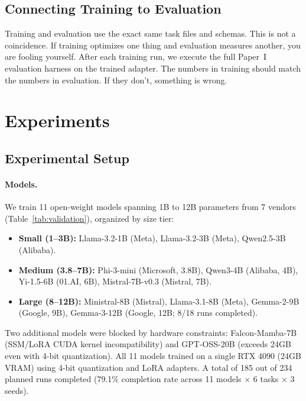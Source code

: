 \documentclass[11pt]{article}
\begin{document}
\subsection{Connecting Training to Evaluation}

Training and evaluation use the exact same task files and schemas.
This is not a coincidence.
If training optimizes one thing and evaluation measures another, you are fooling yourself.
After each training run, we execute the full Paper~I evaluation harness on the trained adapter.
The numbers in training should match the numbers in evaluation.
If they don't, something is wrong.

\section{Experiments}
\label{sec:experiments}

\subsection{Experimental Setup}

\paragraph{Models.}
We train 11 open-weight models spanning 1B to 12B parameters from 7 vendors (Table~\ref{tab:validation}), organized by size tier:
\begin{itemize}[leftmargin=12pt]
    \item \textbf{Small (1--3B):} Llama-3.2-1B (Meta), Llama-3.2-3B (Meta), Qwen2.5-3B (Alibaba).
    \item \textbf{Medium (3.8--7B):} Phi-3-mini (Microsoft, 3.8B), Qwen3-4B (Alibaba, 4B), Yi-1.5-6B (01.AI, 6B), Mistral-7B-v0.3 (Mistral, 7B).
    \item \textbf{Large (8--12B):} Ministral-8B (Mistral), Llama-3.1-8B (Meta), Gemma-2-9B (Google, 9B), Gemma-3-12B (Google, 12B; 8/18 runs completed).
\end{itemize}
Two additional models were blocked by hardware constraints: Falcon-Mamba-7B (SSM/LoRA CUDA kernel incompatibility) and GPT-OSS-20B (exceeds 24GB even with 4-bit quantization).  All 11 models trained on a single RTX 4090 (24GB VRAM) using 4-bit quantization and LoRA adapters.  A total of 185 out of 234 planned runs completed (79.1\% completion rate across 11 models $\times$ 6 tasks $\times$ 3 seeds).
\end{document}
